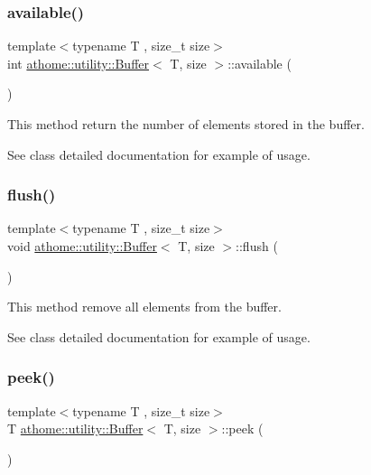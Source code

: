 \subsubsection{\texorpdfstring{available()}{available()}}
{\footnotesize\ttfamily template$<$typename T , size\+\_\+t size$>$ \\
int \mbox{\hyperlink{classathome_1_1utility_1_1_buffer}{athome\+::utility\+::\+Buffer}}$<$ T, size $>$\+::available (\begin{DoxyParamCaption}{ }\end{DoxyParamCaption})\hspace{0.3cm}{\ttfamily [inline]}}

This method return the number of elements stored in the buffer.

See class detailed documentation for example of usage. \mbox{\label{classathome_1_1utility_1_1_buffer_a9fd6b0ad08ed7af5702b43c3b6a617e1}} 
\subsubsection{\texorpdfstring{flush()}{flush()}}
{\footnotesize\ttfamily template$<$typename T , size\+\_\+t size$>$ \\
void \mbox{\hyperlink{classathome_1_1utility_1_1_buffer}{athome\+::utility\+::\+Buffer}}$<$ T, size $>$\+::flush (\begin{DoxyParamCaption}{ }\end{DoxyParamCaption})\hspace{0.3cm}{\ttfamily [inline]}}

This method remove all elements from the buffer.

See class detailed documentation for example of usage. \mbox{\label{classathome_1_1utility_1_1_buffer_a7cd2a38b3f2abc3083f686c49873656a}} 
\subsubsection{\texorpdfstring{peek()}{peek()}}
{\footnotesize\ttfamily template$<$typename T , size\+\_\+t size$>$ \\
T \mbox{\hyperlink{classathome_1_1utility_1_1_buffer}{athome\+::utility\+::\+Buffer}}$<$ T, size $>$\+::peek (\begin{DoxyParamCaption}{ }\end{DoxyParamCaption})\hspace{0.3cm}{\ttfamily [inline]}}

